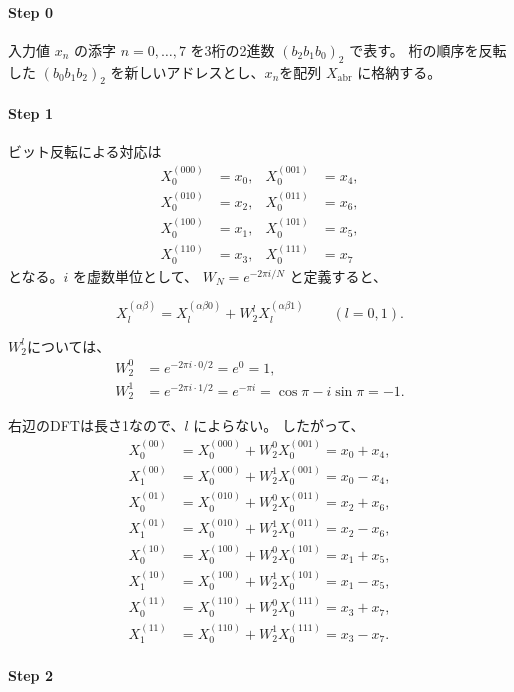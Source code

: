 \documentclass[a4j]{jarticle}
\begin{document}
\paragraph{Step 0}
入力値 $x_n$ の添字 $n=0,\ldots,7$ を3桁の2進数 $(b_2b_1b_0)_2$ で表す。
桁の順序を反転した $(b_0b_1b_2)_2$ を新しいアドレスとし、$x_n$を配列 $X_{\mathrm{abr}}$ に格納する。
\paragraph{Step 1}

ビット反転による対応は
\[
\begin{aligned}
X_0^{(000)} &= x_0, & X_0^{(001)} &= x_4,\\
X_0^{(010)} &= x_2, & X_0^{(011)} &= x_6,\\
X_0^{(100)} &= x_1, & X_0^{(101)} &= x_5,\\
X_0^{(110)} &= x_3, & X_0^{(111)} &= x_7
\end{aligned}
\]
となる。$i$ を虚数単位として、
$W_N=e^{-2\pi i/N}$ と定義すると、

\[
X_l^{(\alpha\beta)}
= X_l^{(\alpha\beta0)} + W_2^l X_l^{(\alpha\beta1)}
\qquad (l=0,1).
\]

$W_2^l$については、
\[
\begin{aligned}
W_2^0 &= e^{-2\pi i\cdot 0/2}=e^0=1,\\
W_2^1 &= e^{-2\pi i\cdot 1/2}=e^{-\pi i}
       =\cos\pi-i\sin\pi=-1.
\end{aligned}
\]

右辺のDFTは長さ1なので、$l$ によらない。
したがって、
\[
\begin{aligned}
X_0^{(00)} &= X_0^{(000)} + W_2^0 X_0^{(001)} = x_0+x_4,\\
X_1^{(00)} &= X_0^{(000)} + W_2^1 X_0^{(001)} = x_0-x_4,\\[4pt]
X_0^{(01)} &= X_0^{(010)} + W_2^0 X_0^{(011)} = x_2+x_6,\\
X_1^{(01)} &= X_0^{(010)} + W_2^1 X_0^{(011)} = x_2-x_6,\\[4pt]
X_0^{(10)} &= X_0^{(100)} + W_2^0 X_0^{(101)} = x_1+x_5,\\
X_1^{(10)} &= X_0^{(100)} + W_2^1 X_0^{(101)} = x_1-x_5,\\[4pt]
X_0^{(11)} &= X_0^{(110)} + W_2^0 X_0^{(111)} = x_3+x_7,\\
X_1^{(11)} &= X_0^{(110)} + W_2^1 X_0^{(111)} = x_3-x_7.
\end{aligned}
\]

\paragraph{Step 2}
\end{document}
